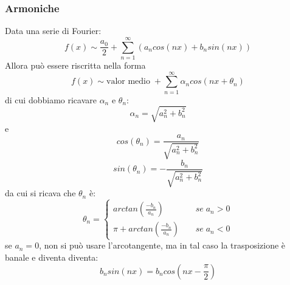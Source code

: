 \subsubsection{Armoniche}
Data una serie di Fourier:
\[
    f(x) \sim  \frac{a_0}{2} + \sum_{n=1}^{\infty}(a_n cos(nx) + b_n sin(nx))
\]
Allora può essere riscritta nella forma
\[
    f(x) \sim \text{valor medio}\; + \sum_{n=1}^{\infty}\alpha_n cos(nx + \theta_n)
\]
di cui dobbiamo ricavare $\alpha_n$ e $\theta_n$:
\[
    \alpha_n = \sqrt{a_n^2 + b_n^2}
\]
e
\[
    cos(\theta_n) = \frac{a_n}{\sqrt{a_n^2 + b_n^2}}
\]
\[
    sin(\theta_n) = -\frac{b_n}{\sqrt{a_n^2 + b_n^2}}
\]
da cui si ricava che $\theta_n$ è:
\[
    \theta_n = \begin{cases}
        arctan\left(\frac{-b_n}{a_n}\right) \;\;\;\; &se \; a_n > 0\\
        \pi + arctan\left(\frac{-b_n}{a_n}\right) \;\;\;\;& se \; a_n < 0
    \end{cases}
\]
se $a_n = 0$, non si può usare l'arcotangente, ma in tal caso la trasposizione è banale e diventa diventa:
\[
    b_n sin(nx) = b_n cos(nx - \frac{\pi}{2})
\]